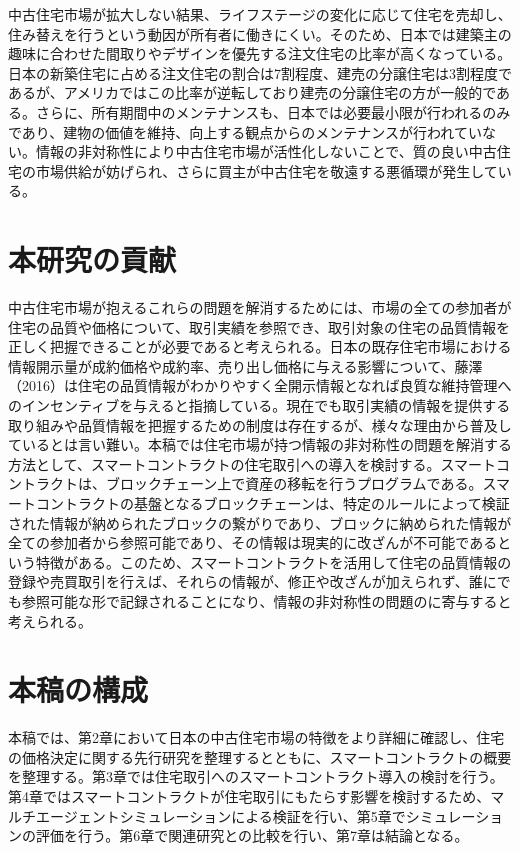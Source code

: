\documentclass[a4paper,fontsize=11pt,report,notitlepage,line_length=38zw,number_of_lines=40,dvipdfmx]{jlreq}
\begin{document}
中古住宅市場が拡大しない結果、ライフステージの変化に応じて住宅を売却し、住み替えを行うという動因が所有者に働きにくい。そのため、日本では建築主の趣味に合わせた間取りやデザインを優先する注文住宅の比率が高くなっている。日本の新築住宅に占める注文住宅の割合は7割程度、建売の分譲住宅は3割程度であるが、アメリカではこの比率が逆転しており建売の分譲住宅の方が一般的である。さらに、所有期間中のメンテナンスも、日本では必要最小限が行われるのみであり、建物の価値を維持、向上する観点からのメンテナンスが行われていない。情報の非対称性により中古住宅市場が活性化しないことで、質の良い中古住宅の市場供給が妨げられ、さらに買主が中古住宅を敬遠する悪循環が発生している。

\section{本研究の貢献}
中古住宅市場が抱えるこれらの問題を解消するためには、市場の全ての参加者が住宅の品質や価格について、取引実績を参照でき、取引対象の住宅の品質情報を正しく把握できることが必要であると考えられる。日本の既存住宅市場における情報開示量が成約価格や成約率、売り出し価格に与える影響について、藤澤（2016）\cite{fujisawa2016}は住宅の品質情報がわかりやすく全開示情報となれば良質な維持管理へのインセンティブを与えると指摘している。現在でも取引実績の情報を提供する取り組みや品質情報を把握するための制度は存在するが、様々な理由から普及しているとは言い難い。本稿では住宅市場が持つ情報の非対称性の問題を解消する方法として、スマートコントラクトの住宅取引への導入を検討する。スマートコントラクトは、ブロックチェーン上で資産の移転を行うプログラムである。スマートコントラクトの基盤となるブロックチェーンは、特定のルールによって検証された情報が納められたブロックの繋がりであり、ブロックに納められた情報が全ての参加者から参照可能であり、その情報は現実的に改ざんが不可能であるという特徴がある。このため、スマートコントラクトを活用して住宅の品質情報の登録や売買取引を行えば、それらの情報が、修正や改ざんが加えられず、誰にでも参照可能な形で記録されることになり、情報の非対称性の問題のに寄与すると考えられる。

\section{本稿の構成}
本稿では、第2章において日本の中古住宅市場の特徴をより詳細に確認し、住宅の価格決定に関する先行研究を整理するとともに、スマートコントラクトの概要を整理する。第3章では住宅取引へのスマートコントラクト導入の検討を行う。第4章ではスマートコントラクトが住宅取引にもたらす影響を検討するため、マルチエージェントシミュレーションによる検証を行い、第5章でシミュレーションの評価を行う。第6章で関連研究との比較を行い、第7章は結論となる。
\end{document}
